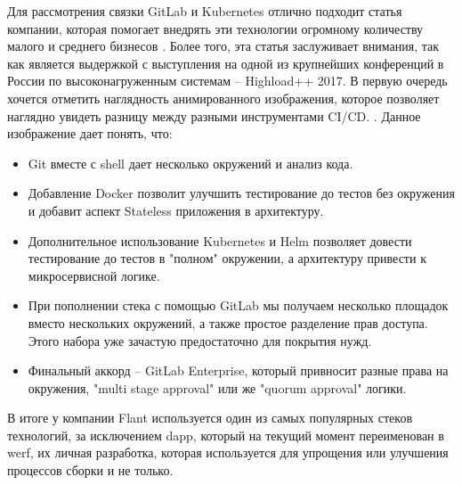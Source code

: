 Для рассмотрения связки GitLab и Kubernetes отлично подходит статья компании, которая помогает внедрять эти технологии огромному количеству малого и среднего бизнесов \cite{habr:flant:k8s-and-gitlab}. Более того, эта статья заслуживает внимания, так как является выдержкой с выступления на одной из крупнейших конференций в России по высоконагруженным системам -- Highload++ 2017. В первую очередь хочется отметить наглядность анимированного изображения, которое позволяет наглядно увидеть разницу между разными инструментами CI/CD.
. Данное изображение дает понять, что:
\begin{itemize}
    \item Git
        вместе с shell
        дает несколько окружений и анализ кода.
    \item Добавление Docker позволит улучшить тестирование до тестов без окружения и добавит аспект Stateless
        приложения в архитектуру.
    \item Дополнительное использование Kubernetes и Helm позволяет довести тестирование до тестов в "полном" окружении, а архитектуру привести к микросервисной логике.
    \item При пополнении стека с помощью GitLab мы получаем несколько площадок вместо нескольких окружений, а также простое разделение прав доступа. Этого набора уже зачастую предостаточно для покрытия нужд.
    \item Финальный аккорд -- GitLab Enterprise, который привносит разные права на окружения, "multi stage approval"
        или же "quorum approval"
        логики.
\end{itemize}
В итоге у компании Flant используется один из самых популярных стеков технологий, за исключением dapp, который на текущий момент переименован в werf, их личная разработка, которая используется для упрощения или улучшения процессов сборки и не только.

